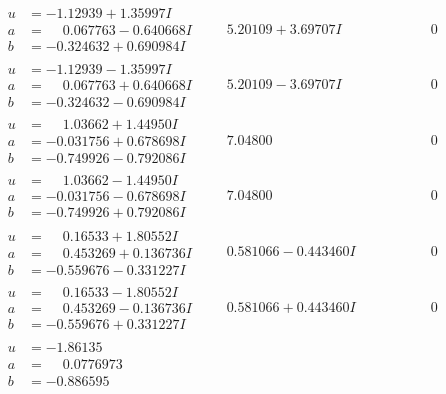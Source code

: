 \documentclass[1p]{elsarticle_modified}
\theoremstyle{definition}
\begin{document}
$$\begin{array}{c|c|c}
\begin{aligned}
u &= -1.12939 + 1.35997 I \\
a &= \phantom{-}0.067763 - 0.640668 I \\
b &= -0.324632 + 0.690984 I\end{aligned}
 & \phantom{-}5.20109 + 3.69707 I & \phantom{-0.000000 } 0 \\ \hline\begin{aligned}
u &= -1.12939 - 1.35997 I \\
a &= \phantom{-}0.067763 + 0.640668 I \\
b &= -0.324632 - 0.690984 I\end{aligned}
 & \phantom{-}5.20109 - 3.69707 I & \phantom{-0.000000 } 0 \\ \hline\begin{aligned}
u &= \phantom{-}1.03662 + 1.44950 I \\
a &= -0.031756 + 0.678698 I \\
b &= -0.749926 - 0.792086 I\end{aligned}
 & \phantom{-}7.04800\phantom{ +0.000000I} & \phantom{-0.000000 } 0 \\ \hline\begin{aligned}
u &= \phantom{-}1.03662 - 1.44950 I \\
a &= -0.031756 - 0.678698 I \\
b &= -0.749926 + 0.792086 I\end{aligned}
 & \phantom{-}7.04800\phantom{ +0.000000I} & \phantom{-0.000000 } 0 \\ \hline\begin{aligned}
u &= \phantom{-}0.16533 + 1.80552 I \\
a &= \phantom{-}0.453269 + 0.136736 I \\
b &= -0.559676 - 0.331227 I\end{aligned}
 & \phantom{-}0.581066 - 0.443460 I & \phantom{-0.000000 } 0 \\ \hline\begin{aligned}
u &= \phantom{-}0.16533 - 1.80552 I \\
a &= \phantom{-}0.453269 - 0.136736 I \\
b &= -0.559676 + 0.331227 I\end{aligned}
 & \phantom{-}0.581066 + 0.443460 I & \phantom{-0.000000 } 0 \\ \hline\begin{aligned}
u &= -1.86135\phantom{ +0.000000I} \\
a &= \phantom{-}0.0776973\phantom{ +0.000000I} \\
b &= -0.886595\phantom{ +0.000000I}\end{aligned}

\end{array}$$
\end{document}
